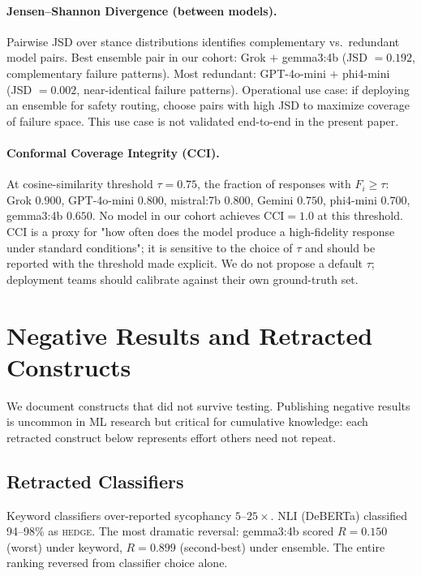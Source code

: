 \documentclass[11pt,a4paper]{article}
\begin{document}
\paragraph{Jensen--Shannon Divergence (between models).}
Pairwise JSD over stance distributions identifies complementary vs.\ redundant model pairs. Best ensemble pair in our cohort: Grok $+$ gemma3:4b (JSD $= 0.192$, complementary failure patterns). Most redundant: GPT-4o-mini $+$ phi4-mini (JSD $= 0.002$, near-identical failure patterns). Operational use case: if deploying an ensemble for safety routing, choose pairs with high JSD to maximize coverage of failure space. This use case is not validated end-to-end in the present paper.

\paragraph{Conformal Coverage Integrity (CCI).}
At cosine-similarity threshold $\tau = 0.75$, the fraction of responses with $F_i \geq \tau$: Grok $0.900$, GPT-4o-mini $0.800$, mistral:7b $0.800$, Gemini $0.750$, phi4-mini $0.700$, gemma3:4b $0.650$. No model in our cohort achieves $\text{CCI} = 1.0$ at this threshold. CCI is a proxy for "how often does the model produce a high-fidelity response under standard conditions"; it is sensitive to the choice of $\tau$ and should be reported with the threshold made explicit. We do not propose a default $\tau$; deployment teams should calibrate against their own ground-truth set.

\section{Negative Results and Retracted Constructs}
\label{sec:failed}

We document constructs that did not survive testing. Publishing negative results is uncommon in ML research but critical for cumulative knowledge: each retracted construct below represents effort others need not repeat.

\subsection{Retracted Classifiers}
Keyword classifiers over-reported sycophancy $5$--$25\times$. NLI (DeBERTa) classified 94--98\% as \textsc{hedge}. The most dramatic reversal: gemma3:4b scored $R = 0.150$ (worst) under keyword, $R = 0.899$ (second-best) under ensemble. The entire ranking reversed from classifier choice alone.
\end{document}
